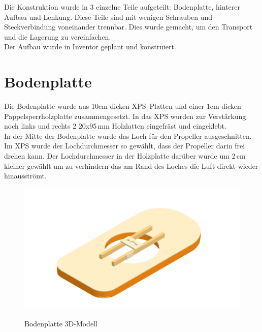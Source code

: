 Die Konstruktion wurde in 3 einzelne Teile aufgeteilt: Bodenplatte, hinterer Aufbau und Lenkung. Diese Teile sind mit wenigen Schrauben und Steckverbindung voneinander trennbar. Dies wurde gemacht, um den Transport und die Lagerung zu vereinfachen.\\
Der Aufbau wurde in Inventor geplant und konstruiert.


\newpage
\section{Bodenplatte}
Die Bodenplatte wurde aus 10cm dicken XPS--Platten und einer 1cm dicken Pappelsperrholzplatte zusammengesetzt. In das XPS wurden zur Verstärkung noch links und rechts 2 20x95\,mm Holzlatten eingefräst und eingeklebt.\\ 
In der Mitte der Bodenplatte wurde das Loch für den Propeller ausgeschnitten. Im XPS wurde der Lochdurchmesser so gewählt, dass der Propeller darin frei drehen kann. Der Lochdurchmesser in der Holzplatte darüber wurde um 2\,cm kleiner gewählt um zu verhindern das am Rand des Loches die Luft direkt wieder hinausströmt.

\begin{figure}[H]
    \centering
    \includegraphics[width=\textwidth]{../../../../Inventor/Bodenplatte/png/BodenplatteHauptansicht.png}
    \label{fig:konst:bodenplatte:gesamt}
    \caption{Bodenplatte 3D-Modell}
\end{figure}

